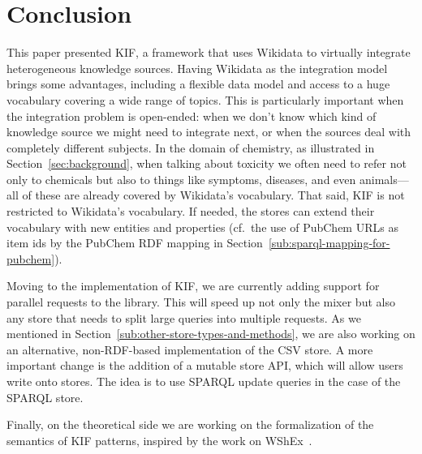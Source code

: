 \section{Conclusion}%
\label{sec:conclusion}


\enlargethispage*{3pt}


This paper presented KIF, a framework that uses Wikidata to virtually integrate heterogeneous knowledge sources.
Having Wikidata as the integration model brings some advantages, including a flexible data model and access to a huge vocabulary covering a wide range of topics.
This is particularly important when the integration problem is open-ended: when we don't know which kind of knowledge source we might need to integrate next, or when the sources deal with completely different subjects.
In the domain of chemistry, as illustrated in Section~\ref{sec:background}, when talking about toxicity we often need to refer not only to chemicals but also to things like symptoms, diseases, and even animals---all of these are already covered by Wikidata's vocabulary.
That said, KIF is not restricted to Wikidata's vocabulary.
If needed, the stores can extend their vocabulary with new entities and properties (cf.~the use of PubChem URLs as item ids by the PubChem RDF mapping in Section~\ref{sub:sparql-mapping-for-pubchem}).




Moving to the implementation of KIF, we are currently adding support for parallel requests to the library.
This will speed up not only the mixer but also any store that needs to split large queries into multiple requests.
As we mentioned in Section~\ref{sub:other-store-types-and-methods}, we are also working on an alternative, non-RDF-based implementation of the CSV store.
A more important change is the addition of a mutable store API, which will allow users write onto stores.
The idea is to use SPARQL update queries in the case of the SPARQL store.


Finally, on the theoretical side we are working on the formalization of the semantics of KIF patterns, inspired by the work on WShEx~\cite{Gayo-J-E-L-2022}.





